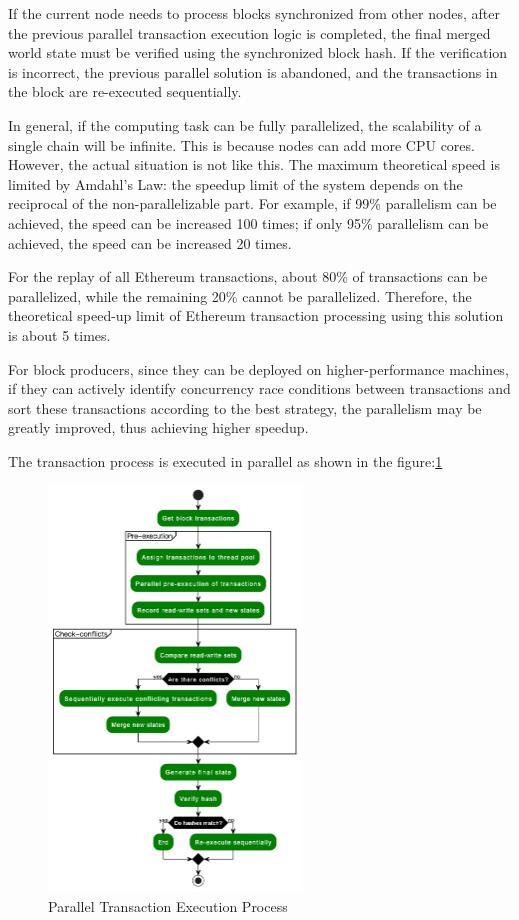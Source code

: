If the current node needs to process blocks synchronized from other nodes, after the previous parallel transaction execution logic is completed, the final merged world state must be verified using the synchronized block hash. If the verification is incorrect, the previous parallel solution is abandoned, and the transactions in the block are re-executed sequentially.

In general, if the computing task can be fully parallelized, the scalability of a single chain will be infinite. This is because nodes can add more CPU cores. However, the actual situation is not like this. The maximum theoretical speed is limited by Amdahl's Law\cite{website:Amdahls-law}: the speedup limit of the system depends on the reciprocal of the non-parallelizable part. For example, if 99\% parallelism can be achieved, the speed can be increased 100 times; if only 95\% parallelism can be achieved, the speed can be increased 20 times.

For the replay of all Ethereum transactions, about 80\% of transactions can be parallelized, while the remaining 20\% cannot be parallelized. Therefore, the theoretical speed-up limit of Ethereum transaction processing using this solution is about 5 times.

For block producers, since they can be deployed on higher-performance machines, if they can actively identify concurrency race conditions between transactions and sort these transactions according to the best strategy, the parallelism may be greatly improved, thus achieving higher speedup.

The transaction process is executed in parallel as shown in the figure:\ref{fig:paralle-execution}

\begin{figure}[!ht]
    \centering
    \includegraphics[width=0.6\textwidth]{images/paralle-execution.jpg}
    \caption{Parallel Transaction Execution Process}
    \label{fig:paralle-execution}
\end{figure}

